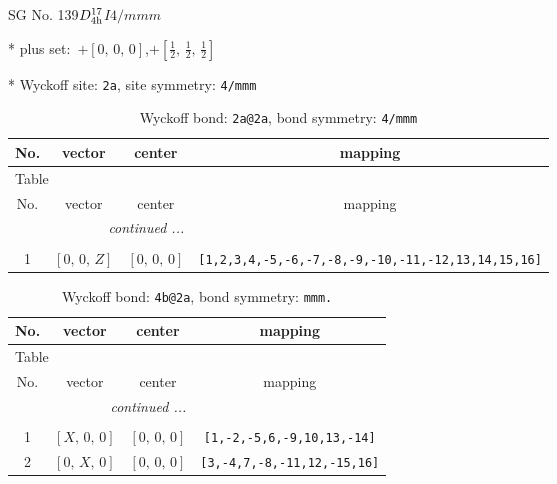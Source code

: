 \documentclass[fleqn,8pt]{jsarticle}
\begin{document}
\setcounter{MaxMatrixCols}{32}

\renewcommand{\tablename}{Table~}
\renewcommand{\figurename}{Figure~}
\begin{center}
\LARGE
SG No. 139\quad$D_{\rm 4h}^{17}$\quad$I4/mmm$\quad[ tetragonal ]
\end{center}

* plus set:\,\,\,$+\left[ 0,\, 0,\, 0 \right]$,\quad $+\left[ \frac{1}{2},\, \frac{1}{2},\, \frac{1}{2} \right]$


* Wyckoff site: {\tt 2a}, site symmetry: {\tt 4/mmm}
\renewcommand{\arraystretch}{1.2}
\begin{longtable}{cccc}
\caption{Wyckoff bond: {\tt 2a@2a}, bond symmetry: {\tt 4/mmm}}
 \\
 \hline \hline
No. & vector & center & mapping \\ \hline \endfirsthead

\multicolumn{3}{l}{\tablename\ \thetable{}} \\
 \hline \hline
No. & vector & center & mapping \\ \hline \endhead

 \hline \hline
\multicolumn{3}{r}{\footnotesize\it continued ...} \\ \endfoot

 \hline \hline
\multicolumn{3}{r}{} \\ \endlastfoot

1 & $\left[ 0,\, 0,\, Z \right]$ & $\left[ 0,\, 0,\, 0 \right]$ & {\tt [1,2,3,4,-5,-6,-7,-8,-9,-10,-11,-12,13,14,15,16]} \\
\end{longtable}
\renewcommand{\arraystretch}{1.2}
\begin{longtable}{cccc}
\caption{Wyckoff bond: {\tt 4b@2a}, bond symmetry: {\tt mmm.}}
 \\
 \hline \hline
No. & vector & center & mapping \\ \hline \endfirsthead

\multicolumn{3}{l}{\tablename\ \thetable{}} \\
 \hline \hline
No. & vector & center & mapping \\ \hline \endhead

 \hline \hline
\multicolumn{3}{r}{\footnotesize\it continued ...} \\ \endfoot

 \hline \hline
\multicolumn{3}{r}{} \\ \endlastfoot

1 & $\left[ X,\, 0,\, 0 \right]$ & $\left[ 0,\, 0,\, 0 \right]$ & {\tt [1,-2,-5,6,-9,10,13,-14]} \\ \hline
2 & $\left[ 0,\, X,\, 0 \right]$ & $\left[ 0,\, 0,\, 0 \right]$ & {\tt [3,-4,7,-8,-11,12,-15,16]} \\
\end{longtable}
\end{document}
